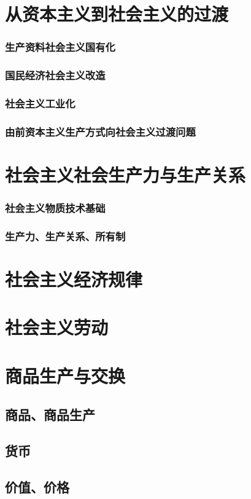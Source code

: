 \documentclass[UTF8]{../../RepresentationUniverse}
\begin{document}
\section{从资本主义到社会主义的过渡}
    \subsubsection{生产资料社会主义国有化}
    \subsubsection{国民经济社会主义改造}
    \subsubsection{社会主义工业化}
    \subsubsection{由前资本主义生产方式向社会主义过渡问题}
\section{社会主义社会生产力与生产关系}
    \subsubsection{社会主义物质技术基础}
    \subsubsection{生产力、生产关系、所有制}
\section{社会主义经济规律}
\section{社会主义劳动}
\section{商品生产与交换}
    \subsection{商品、商品生产}
    \subsection{货币}
    \subsection{价值、价格}
\end{document}
